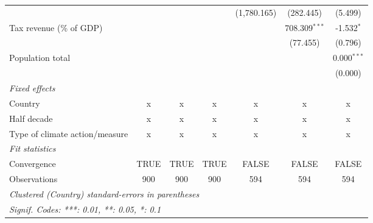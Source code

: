 \begin{tabular}{lcccccc}
                                                  &         &                &                & (1,780.165)        & (282.445)        & (5.499)\\   
   Tax revenue (\% of GDP)                        &         &                &                &                    & 708.309$^{***}$  & -1.532$^{*}$\\   
                                                  &         &                &                &                    & (77.455)         & (0.796)\\   
   Population total                               &         &                &                &                    &                  & 0.000$^{***}$\\   
                                                  &         &                &                &                    &                  & (0.000)\\   
   \emph{Fixed effects}\\
   Country                                        & x       & x              & x              & x                  & x                & x\\  
   Half decade                                    & x       & x              & x              & x                  & x                & x\\  
   Type of climate action/measure                 & x       & x              & x              & x                  & x                & x\\  
   \midrule \emph{Fit statistics}\\
   Convergence                                    &TRUE     & TRUE           & TRUE           & FALSE              & FALSE            & FALSE\\  
   Observations                                   & 900     & 900            & 900            & 594                & 594              & 594\\  
   \midrule
   \multicolumn{7}{l}{\emph{Clustered (Country) standard-errors in parentheses}}\\
   \multicolumn{7}{l}{\emph{Signif. Codes: ***: 0.01, **: 0.05, *: 0.1}}\\
\end{tabular}
\par\endgroup


